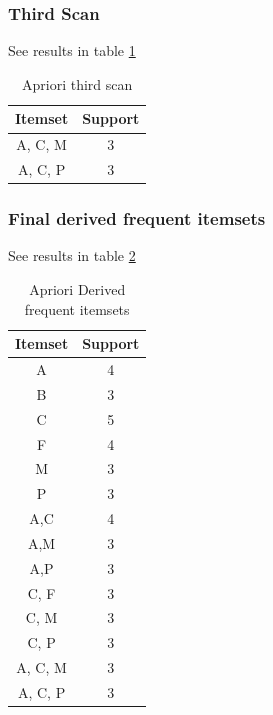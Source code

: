 \documentclass[11pt]{article}
\begin{document}
\subsubsection{Third Scan}
See results in table \ref{tab:3rd}
\begin{table}[!htbp]
    \centering
    \begin{tabular}{|c|c|} \hline
        Itemset & Support \\ \hline
        A, C, M & 3  \\ \hline
        A, C, P & 3  \\ \hline
    \end{tabular}
    \caption{Apriori third scan}
    \label{tab:3rd}
\end{table}
\subsubsection{Final derived frequent itemsets}
See results in table \ref{tab:final}
\begin{table}[!htbp]
    \centering
    \begin{tabular}{|c|c|} \hline
        Itemset & Support \\ \hline
        A & 4 \\ \hline
        B & 3 \\ \hline
        C & 5 \\ \hline
        F & 4 \\ \hline
        M & 3 \\ \hline
        P & 3 \\ \hline
        A,C & 4 \\ \hline
        A,M & 3 \\ \hline
        A,P & 3 \\ \hline
        C, F & 3 \\ \hline
        C, M & 3 \\ \hline
        C, P & 3 \\ \hline
        A, C, M & 3  \\ \hline
        A, C, P & 3  \\ \hline
    \end{tabular}
    \caption{Apriori Derived frequent itemsets}
    \label{tab:final}
\end{table}
\end{document}
